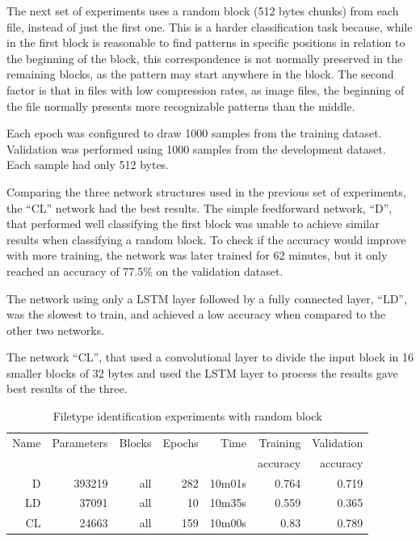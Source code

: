 The next set of experiments uses a random block (512 bytes chunks) from each file, instead of just the first one. This is a harder classification task because, while in the first block is reasonable to find patterns in specific positions in relation to the beginning of the block, this correspondence is not normally preserved in the remaining blocks, as the pattern may start anywhere in the block. The second factor is that in files with low compression rates, as image files, the beginning of the file normally presents more recognizable patterns than the middle.

Each epoch was configured to draw 1000 samples from the training dataset. Validation was performed using 1000 samples from the development dataset. Each sample had only 512 bytes.

Comparing the three network structures used in the previous set of experiments, the ``CL'' network had the best results.
The simple feedforward network, ``D'', that performed well classifying the first block was unable to achieve similar results when classifying a random block.
To check if the accuracy would improve with more training, the network was later trained for 62 minutes, but it only reached an accuracy of 77.5\% on the validation dataset.

The network using only a LSTM layer followed by a fully connected layer, ``LD'', was the slowest to train, and achieved a low accuracy when compared to the other two networks.

The network ``CL'', that used a convolutional layer to divide the input block in 16 smaller blocks of 32 bytes and used the LSTM layer to process the results gave best results of the three.

\begin{table}[!ht]
    \centering
    \caption{Filetype identification experiments with random block}
    \label{tab:carvingrandomblock}
\begin{tabular}{r|r|r|r|r|r|r}
\hline
Name & Parameters & Blocks & Epochs & Time    & Training          & Validation          \\       
     &            &        &        &         &          accuracy &            accuracy \\ \hline\hline

D       & 393219    & all   & 282   & 10m01s    & 0.764 & 0.719 \\\hline
LD      & 37091     & all   & 10    & 10m35s    & 0.559 & 0.365 \\\hline
CL      & 24663     & all   & 159   & 10m00s    & 0.83  & 0.789 \\\hline
\end{tabular}
\end{table}

